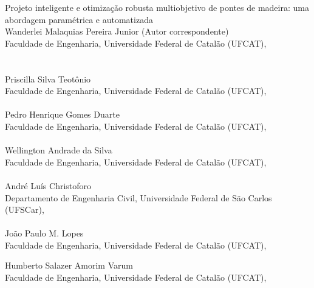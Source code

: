 \begin{center}
{\Huge Projeto inteligente e otimização robusta multiobjetivo de pontes de madeira: uma abordagem paramétrica e automatizada}
\\[5ex]

{\large Wanderlei Malaquias Pereira Junior \small(Autor correspondente)} \\
{\small
Faculdade de Engenharia, Universidade Federal de Catalão (UFCAT),  \\
 \\
} \\[1.2em]

{\large Priscilla Silva Teotônio} \\
{\small
Faculdade de Engenharia, Universidade Federal de Catalão (UFCAT),  \\
} \\[1.2em]

{\large Pedro Henrique Gomes Duarte} \\
{\small
Faculdade de Engenharia, Universidade Federal de Catalão (UFCAT),  \\
} \\[1.2em]

{\large Wellington Andrade da Silva} \\
{\small
Faculdade de Engenharia, Universidade Federal de Catalão (UFCAT),  \\
} \\[1.2em]

{\large André Luís Christoforo} \\
{\small
Departamento de Engenharia Civil, Universidade Federal de São Carlos (UFSCar),  \\
} \\[1.2em]

{\large João Paulo M. Lopes} \\
{\small
Faculdade de Engenharia, Universidade Federal de Catalão (UFCAT),  \\
}

{\large Humberto Salazer Amorim Varum} \\
{\small
Faculdade de Engenharia, Universidade Federal de Catalão (UFCAT),  \\
}


\end{center}
